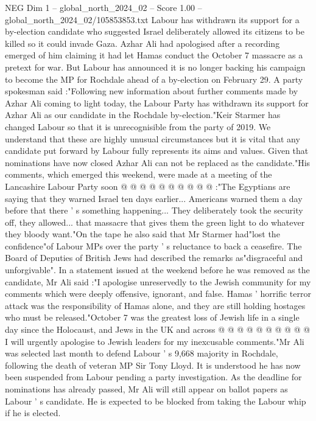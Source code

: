 \begin{textsample}{NEG Dim 1 – global\_north\_2024\_02 – Score 1.00 – global\_north\_2024\_02/105853853.txt}  \label{ex:f1_neg_352}
Labour has withdrawn its support for a by-election candidate who suggested Israel deliberately allowed its citizens to be killed so it could invade Gaza.
Azhar Ali had apologised after a recording emerged of him claiming it had let Hamas conduct the October 7 massacre as a pretext for war.
But Labour has announced it is no longer backing his campaign to become the MP for Rochdale ahead of a by-election on February 29.
A party spokesman said :"Following new information about further comments made by Azhar Ali coming to light today, the Labour Party has withdrawn its support for Azhar Ali as our candidate in the Rochdale by-election."Keir Starmer has changed Labour so that it is unrecognisible from the party of 2019.
We understand that these are highly unusual circumstances but it is vital that any candidate put forward by Labour fully represents its aims and values.
Given that nominations have now closed Azhar Ali can not be replaced as the candidate."His comments, which emerged this weekend, were made at a meeting of the Lancashire Labour Party soon @ @ @ @ @ @ @ @ @ @ :"The Egyptians are saying that they warned Israel ten days earlier...
Americans warned them a day before that there ' s something happening...
They deliberately took the security off, they allowed... that massacre that gives them the green light to do whatever they bloody want."On the tape he also said that Mr Starmer had"lost the confidence"of Labour MPs over the party ' s reluctance to back a ceasefire.
The Board of Deputies of British Jews had described the remarks as"disgraceful and unforgivable".
In a statement issued at the weekend before he was removed as the candidate, Mr Ali said :"I apologise unreservedly to the Jewish community for my comments which were deeply offensive, ignorant, and false.
Hamas ' horrific terror attack was the responsibility of Hamas alone, and they are still holding hostages who must be released."October 7 was the greatest loss of Jewish life in a single day since the Holocaust, and Jews in the UK and across @ @ @ @ @ @ @ @ @ @ I will urgently apologise to Jewish leaders for my inexcusable comments."Mr Ali was selected last month to defend Labour ' s 9,668 majority in Rochdale, following the death of veteran MP Sir Tony Lloyd.
It is understood he has now been suspended from Labour pending a party investigation.
As the deadline for nominations has already passed, Mr Ali will still appear on ballot papers as Labour ' s candidate.
He is expected to be blocked from taking the Labour whip if he is elected.

\end{textsample}
